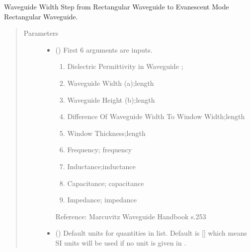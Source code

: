 \documentclass[letterpaper,10pt,english]{sphinxmanual}
\begin{document}

\begin{fulllineitems}
\label{\detokenize{components:components.InductiveWindowInWaveguide}}
Waveguide Width Step from Rectangular Waveguide to Evanescent Mode Rectangular Waveguide.
\begin{quote}\begin{description}
\item[{Parameters}] \leavevmode\begin{itemize}
\item {} 
 () \textendash{} 
First 6 arguments are inputs.
\begin{enumerate}
%
\item {} 
Dielectric Permittivity in Waveguide ;

\item {} 
Waveguide Width (a);length

\item {} 
Waveguide Height (b);length

\item {} 
Difference Of Waveguide Width To Window Width;length

\item {} 
Window Thickness;length

\item {} 
Frequency; frequency

\item {} 
Inductance;inductance

\item {} 
Capacitance; capacitance

\item {} 
Impedance; impedance

\end{enumerate}

Reference:  Marcuvitz Waveguide Handbook s.253


\item {} 
 (\sphinxstyleliteralemphasis{\sphinxupquote{, }}) \textendash{} Default units for quantities in  list. Default is {[}{]} which means SI units will be used if no unit is given in .


\end{itemize}
\end{description}
\end{quote}
\end{fulllineitems}
\end{document}
